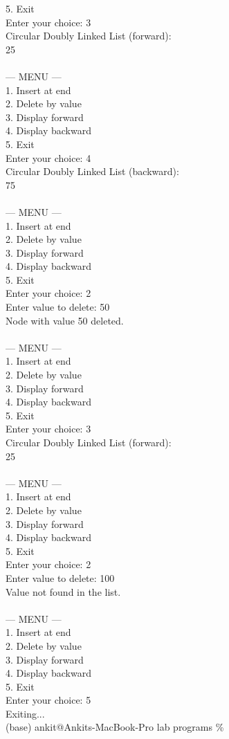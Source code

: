\documentclass[12pt,a4paper]{article}
\begin{document}
\begin{tcolorbox}[terminalstyle, title=Sample Output]
{5. Exit\\
Enter your choice: 3\\
Circular Doubly Linked List (forward):\\
25  \\
\\
--- MENU ---\\
1. Insert at end\\
2. Delete by value\\
3. Display forward\\
4. Display backward\\
5. Exit\\
Enter your choice: 4\\
Circular Doubly Linked List (backward):\\
75  \\
\\
--- MENU ---\\
1. Insert at end\\
2. Delete by value\\
3. Display forward\\
4. Display backward\\
5. Exit\\
Enter your choice: 2\\
Enter value to delete: 50\\
Node with value 50 deleted.\\
\\
--- MENU ---\\
1. Insert at end\\
2. Delete by value\\
3. Display forward\\
4. Display backward\\
5. Exit\\
Enter your choice: 3\\
Circular Doubly Linked List (forward):\\
25 \\
\\
--- MENU ---\\
1. Insert at end\\
2. Delete by value\\
3. Display forward\\
4. Display backward\\
5. Exit\\
Enter your choice: 2\\
Enter value to delete: 100\\
Value not found in the list.\\
\\
--- MENU ---\\
1. Insert at end\\
2. Delete by value\\
3. Display forward\\
4. Display backward\\
5. Exit\\
Enter your choice: 5\\
Exiting...\\
(base) ankit@Ankits-MacBook-Pro lab programs \%
}
\end{tcolorbox}
\end{document}
